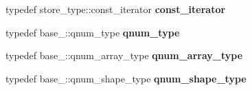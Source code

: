 \begin{DoxyCompactItemize}
\item 
\hypertarget{classbtas_1_1_block_sp_tensor_aa40db2872dd6c8073d5972ec8949b8f6}{
typedef store\_\-type::const\_\-iterator {\bfseries const\_\-iterator}}
\label{classbtas_1_1_block_sp_tensor_aa40db2872dd6c8073d5972ec8949b8f6}

\item 
\hypertarget{classbtas_1_1_block_sp_tensor_a6a784ffff40562c1a15b806348900dca}{
typedef base\_\-::qnum\_\-type {\bfseries qnum\_\-type}}
\label{classbtas_1_1_block_sp_tensor_a6a784ffff40562c1a15b806348900dca}

\item 
\hypertarget{classbtas_1_1_block_sp_tensor_a7960cb62a2c431ece39ea4fc1088e59d}{
typedef base\_\-::qnum\_\-array\_\-type {\bfseries qnum\_\-array\_\-type}}
\label{classbtas_1_1_block_sp_tensor_a7960cb62a2c431ece39ea4fc1088e59d}

\item 
\hypertarget{classbtas_1_1_block_sp_tensor_a3eb02a4012f5e94a82908dc44b473f3d}{
typedef base\_\-::qnum\_\-shape\_\-type {\bfseries qnum\_\-shape\_\-type}}
\label{classbtas_1_1_block_sp_tensor_a3eb02a4012f5e94a82908dc44b473f3d}

\end{DoxyCompactItemize}
